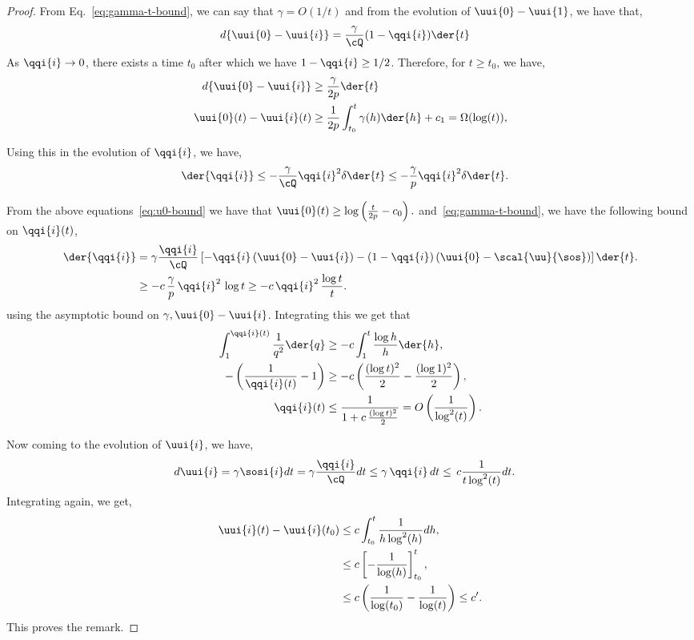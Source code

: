 \documentclass{article}
\theoremstyle{plain}
\theoremstyle{definition}
\theoremstyle{remark}
\begin{document}
\begin{proof}
From Eq.~\eqref{eq:gamma-t-bound}, we can say that $\gamma = O(1/t)$ and from the evolution of $\uui{0} - \uui{1}$, we have that, 
\begin{align*}
    d \{\uui{0} - \uui{i}\} &= \frac{\gamma}{\cQ} ( 1 - \qqi{i} ) \der{t} 
\end{align*}
As $\qqi{i} \to 0$, there exists a time $t_0$ after which we have $1 - \qqi{i} \geq 1/2$. Therefore, for $t \geq t_0$, we have,
\begin{align*}
    d \{\uui{0} - \uui{i}\} &\geq \frac{\gamma}{2p} \der{t} \\
    \uui{0}(t) - \uui{i}(t) &\geq \frac{1}{2p} \int_{t_0}^{t} \gamma(h) \der{h} + c_1 = \Omega(\log(t)),
\end{align*}

Using this in the evolution of $\qqi{i}$, we have,
\begin{align*}
    \der{\qqi{i}} &\leq - \frac{\gamma}{\cQ} \qqi{i}^2 \delta \der{t} \leq -  \frac{\gamma}{p} \qqi{i}^2 \delta \der{t}.
\end{align*}

    From the above equations~\eqref{eq:u0-bound} we have that $\uui{0}(t) \geq \log\left(  \frac{t}{2p} - c_0  \right).$ and~\eqref{eq:gamma-t-bound}, we have the following bound on $\qqi{i}(t)$,
\begin{align*}
    \der{\qqi{i}}
    &= \gamma \frac{\qqi{i}}{\cQ} \left[ - \qqi{i} \left( \uui{0} - \uui{i} \right) - \left(  1 - \qqi{i} \right)\left(  \uui{0} - \scal{\uu}{\sos} \right) \right] \der{t}. \\
    &\geq - c \, \frac{\gamma}{p} \, \qqi{i}^2 \, \log{t} \geq - c  \, \qqi{i}^2 \, \frac{\log{t}}{t}.
\end{align*}
using the asymptotic bound on $\gamma, \uui{0} - \uui{i}$. Integrating this we get that 
\begin{align*}
    \int_{1}^{\qqi{i}(t)} \frac{1}{q^2} \der{q} &\geq - c \int_{1}^{t} \frac{\log{h}}{h} \der{h}, \\
    - \left( \frac{1}{\qqi{i}(t)} - 1 \right) &\geq - c \left( \frac{(\log{t})^2}{2} - \frac{(\log{1})^2}{2} \right), \\
    \qqi{i}(t) &\leq \frac{1}{1 + c \, \frac{(\log{t})^2}{2}} = O\left( \frac{1}{\log^2(t)} \right).
\end{align*}

Now coming to the evolution of $\uui{i}$, we have,
\begin{align*}
    d{\uui{i}} &=  \gamma  \sosi{i} dt =  \gamma \frac{\qqi{i}}{\cQ} d{t} \leq \gamma \, \qqi{i} \, d{t} \leq \, c \frac{1}{t \log^2(t)} d{t}.   
\end{align*}
Integrating again, we get, 
\begin{align*}
    \uui{i}(t) - \uui{i}(t_0) &\leq c \int_{t_0}^{t} \frac{1}{h \log^2(h)} d{h}, \\
    &\leq c \left[ - \frac{1}{\log(h)} \right]_{t_0}^{t}, \\
    &\leq c \left( \frac{1}{\log(t_0)} - \frac{1}{\log(t)} \right) \leq c'.
\end{align*}
This proves the remark.
\end{proof}
\end{document}
